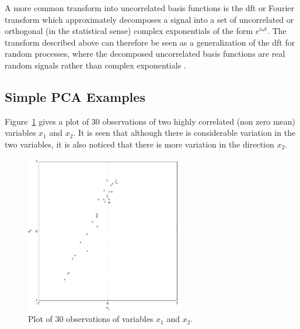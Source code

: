 A more common transform into uncorrelated basis functions is the \gls{dft} or Fourier transform which approximately decomposes a signal into a set of uncorrelated or orthogonal (in the statistical sense) complex exponentials of the form $e^{i\omega t}$. The transform described above can therefore be seen as a generalization of the \gls{dft} for random processes, where the decomposed uncorrelated basis functions are real random signals rather than complex exponentials \citep[chap. 4.6]{Therrien1992}.

\subsection{Simple PCA Examples}

Figure~\ref{fig:30observations} gives a plot of 30 observations of two highly correlated (non zero mean) variables $x_1$ and $x_2$. It is seen that although there is considerable variation in the two variables, it is also noticed that there is more variation in the direction $x_2$.
\begin{figure}[!]
  \begin{center}
    \includegraphics[width=260px]{30observations.pdf}
    \caption{Plot of 30 observations of variables $x_1$ and $x_2$.}\label{fig:30observations}
  \end{center}
\end{figure}

